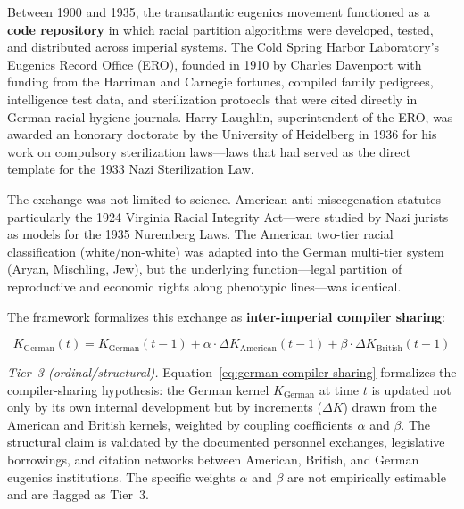 Between 1900 and 1935, the transatlantic eugenics movement functioned as a \textbf{code repository} in which racial partition algorithms were developed, tested, and distributed across imperial systems. The Cold Spring Harbor Laboratory's Eugenics Record Office (ERO), founded in 1910 by Charles Davenport with funding from the Harriman and Carnegie fortunes, compiled family pedigrees, intelligence test data, and sterilization protocols that were cited directly in German racial hygiene journals. Harry Laughlin, superintendent of the ERO, was awarded an honorary doctorate by the University of Heidelberg in 1936 for his work on compulsory sterilization laws---laws that had served as the direct template for the 1933 Nazi Sterilization Law.

The exchange was not limited to science. American anti-miscegenation statutes---particularly the 1924 Virginia Racial Integrity Act---were studied by Nazi jurists as models for the 1935 Nuremberg Laws. The American two-tier racial classification (white/non-white) was adapted into the German multi-tier system (Aryan, Mischling, Jew), but the underlying function---legal partition of reproductive and economic rights along phenotypic lines---was identical.

The framework formalizes this exchange as \textbf{inter-imperial compiler sharing}:

\begin{equation}\label{eq:german-compiler-sharing}
K_{\text{German}}(t) = K_{\text{German}}(t-1) + \alpha \cdot \Delta K_{\text{American}}(t-1) + \beta \cdot \Delta K_{\text{British}}(t-1)
\end{equation}

\noindent\textit{Tier~3 (ordinal/structural).} Equation~\ref{eq:german-compiler-sharing} formalizes the compiler-sharing hypothesis: the German kernel $K_{\text{German}}$ at time $t$ is updated not only by its own internal development but by increments ($\Delta K$) drawn from the American and British kernels, weighted by coupling coefficients $\alpha$ and $\beta$. The structural claim is validated by the documented personnel exchanges, legislative borrowings, and citation networks between American, British, and German eugenics institutions. The specific weights $\alpha$ and $\beta$ are not empirically estimable and are flagged as Tier~3.

